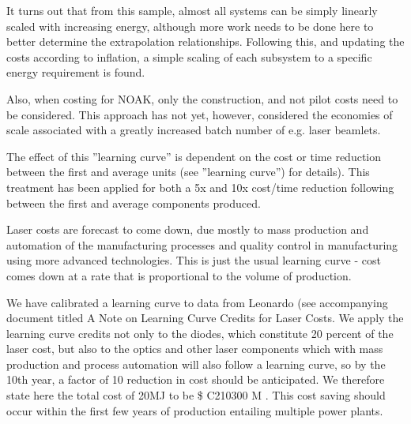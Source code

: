 It turns out that from this sample, almost all systems can be simply linearly scaled with increasing energy, although more work  needs to be done here to better determine the extrapolation relationships.  Following this, and updating the costs according to inflation, a simple scaling of each subsystem to a specific energy requirement is found.

Also, when costing for NOAK, only the construction, and not pilot costs need to be considered. This approach has not yet, however, considered the economies of scale associated with a greatly increased batch 
number of e.g. laser beamlets.

The effect of this ''learning curve'' is dependent on the cost or time reduction between the first and average units (see ''learning curve'') for details). This treatment has been applied for both a 5x and 10x cost/time 
reduction following between the first and average components produced.

Laser costs are forecast to come down, due mostly to mass production and automation of the manufacturing processes and quality control in manufacturing using more advanced technologies. This is just the usual learning curve - cost comes down at a rate that is proportional to the volume of production. 

We have calibrated a learning curve to data from Leonardo (see accompanying document titled A Note on Learning Curve Credits for Laser Costs. We apply the learning curve credits not only to the diodes, which constitute 20 percent of the laser cost, but also to the optics and other laser components which with mass production and process automation will also follow a learning curve, so by the 10th year, a factor of 10 reduction in cost should be anticipated.  We therefore state here the total cost of 20MJ to be \$ C210300 M .  This cost saving should occur within the first few years of production entailing multiple power plants.

